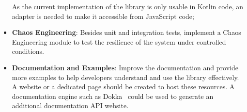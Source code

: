 \begin{itemize}
    As the current implementation of the library is only usable in Kotlin code, an adapter is needed to make it accessible from JavaScript code;
    \item \textbf{Chaos Engineering}: Besides unit and integration tests, implement a Chaos Engineering module to test the resilience of the system under controlled conditions.
    \item \textbf{Documentation and Examples}:
    Improve the documentation
    and provide more examples to help developers understand and use the library effectively.
    A website or a dedicated page should be created
    to host these resources.
    A documentation engine such as Dokka~\cite{dokka} could be used to generate an additional documentation API website.
\end{itemize}

